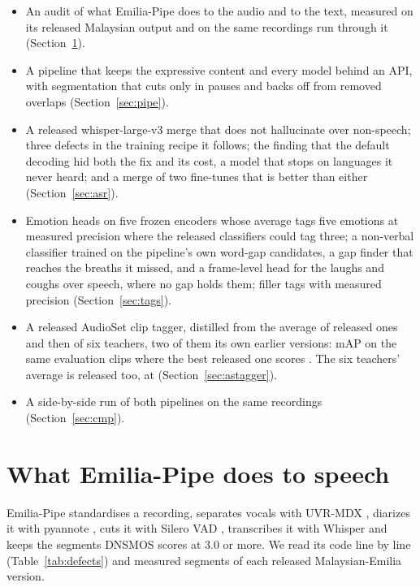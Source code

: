 \documentclass[10pt]{article}
\begin{document}
\begin{itemize}
\item An audit of what Emilia-Pipe does to the audio and to the text, measured on its released Malaysian output
  and on the same recordings run through it (Section~\ref{sec:audit}).
\item A pipeline that keeps the expressive content and every model behind an API, with segmentation that cuts
  only in pauses and backs off from removed overlaps (Section~\ref{sec:pipe}).
\item A released whisper-large-v3 merge that does not hallucinate over non-speech; three defects in the training
  recipe it follows; the finding that the default decoding hid both the fix and its cost, a model that stops on
  languages it never heard; and a merge of two fine-tunes that is better than either (Section~\ref{sec:asr}).
\item Emotion heads on five frozen encoders whose average tags five emotions at measured precision where the
  released classifiers could tag three; a non-verbal classifier trained on the pipeline's own word-gap candidates,
  a gap finder that reaches the breaths it missed, and a frame-level head for the laughs and coughs over speech,
  where no gap holds them; filler tags with measured precision
  (Section~\ref{sec:tags}).
\item A released AudioSet clip tagger, distilled from the average of released ones and then of six teachers, two of them
  its own earlier versions:  mAP on the same evaluation clips where the best released one scores
  . The six teachers' average is released too, at  (Section~\ref{sec:astagger}).
\item A side-by-side run of both pipelines on the same recordings (Section~\ref{sec:cmp}).
\end{itemize}

\section{What Emilia-Pipe does to speech}
\label{sec:audit}

Emilia-Pipe standardises a recording, separates vocals with UVR-MDX \citep{kim2021mdx}, diarizes it with
pyannote \citep{bredin2023pyannote}, cuts it with Silero VAD \citep{silero2024vad}, transcribes it with Whisper
\citep{radford2023robust} and keeps the segments DNSMOS \citep{reddy2022dnsmos} scores at 3.0 or more. We read its
code line by line (Table~\ref{tab:defects}) and measured  segments of each released
Malaysian-Emilia version.
\end{document}
